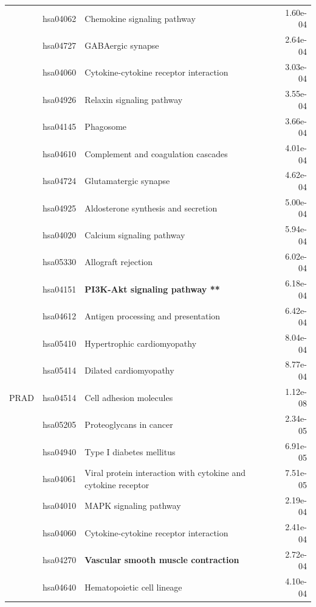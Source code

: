 \begin{longtable}{cllr}
 & hsa04062 & \textcolor{\clrnew}{Chemokine signaling pathway} & 1.60e-04 \\ 
 & hsa04727 & \textcolor{\clrnew}{GABAergic synapse} & 2.64e-04 \\ 
 & hsa04060 & \textcolor{\clrnew}{Cytokine-cytokine receptor interaction} & 3.03e-04 \\ 
 & hsa04926 & \textcolor{\clrnew}{Relaxin signaling pathway} & 3.55e-04 \\ 
 & hsa04145 & \textcolor{\clrnew}{Phagosome} & 3.66e-04 \\ 
 & hsa04610 & \textcolor{\clrnew}{Complement and coagulation cascades} & 4.01e-04 \\ 
 & hsa04724 & \textcolor{\clrnew}{Glutamatergic synapse} & 4.62e-04 \\ 
 & hsa04925 & \textcolor{\clrnew}{Aldosterone synthesis and secretion} & 5.00e-04 \\ 
 & hsa04020 & \textcolor{\clrnew}{Calcium signaling pathway} & 5.94e-04 \\ 
 & hsa05330 & \textcolor{\clrnew}{Allograft rejection} & 6.02e-04 \\ 
 \rowcolor{\clrpath}& hsa04151 & \textbf{PI3K-Akt signaling pathway **} & 6.18e-04 \\ 
 & hsa04612 & \textcolor{\clrnew}{Antigen processing and presentation} & 6.42e-04 \\ 
 & hsa05410 & \textcolor{\clrnew}{Hypertrophic cardiomyopathy} & 8.04e-04 \\ 
 & hsa05414 & \textcolor{\clrnew}{Dilated cardiomyopathy} & 8.77e-04 \\ 
\midrule 
PRAD & hsa04514 & \textcolor{\clrnew}{Cell adhesion molecules} & 1.12e-08\\ 
 & hsa05205 & \textcolor{\clrnew}{Proteoglycans in cancer} & 2.34e-05 \\ 
 & hsa04940 & \textcolor{\clrnew}{Type I diabetes mellitus} & 6.91e-05 \\ 
 & hsa04061 & \textcolor{\clrnew}{Viral protein interaction with cytokine and cytokine receptor} & 7.51e-05 \\ 
 & hsa04010 & \textcolor{\clrnew}{MAPK signaling pathway} & 2.19e-04 \\ 
 & hsa04060 & \textcolor{\clrnew}{Cytokine-cytokine receptor interaction} & 2.41e-04 \\ 
 \rowcolor{\clrpath}& hsa04270 & \textbf{Vascular smooth muscle contraction} & 2.72e-04 \\ 
 & hsa04640 & \textcolor{\clrnew}{Hematopoietic cell lineage} & 4.10e-04 \\ 

\end{longtable}
